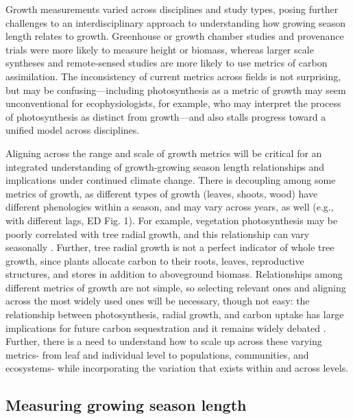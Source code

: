 \documentclass[11pt]{article}
\begin{document}
Growth measurements varied across disciplines and study types, posing further challenges to an interdisciplinary approach to understanding how growing season length relates to growth. 
Greenhouse or growth chamber studies and provenance trials were more likely to measure height or biomass, whereas larger scale syntheses and remote-sensed studies are more likely to use metrics of carbon assimilation. 
The inconsistency of current metrics across fields is not surprising, but may be confusing---including photosynthesis as a metric of growth may seem unconventional for ecophysiologists, for example, who may interpret the process of photosynthesis as distinct from growth---and also stalls progress toward a unified model across disciplines.

Aligning across the range and scale of growth metrics will be critical for an integrated understanding of growth-growing season length relationships and implications under continued climate change.  
There is decoupling among some metrics of growth, as different types of growth (leaves, shoots, wood) have different phenologies within a season, and may vary across years, as well (e.g., with different lags, ED Fig. 1).
For example, vegetation photosynthesis may be poorly correlated with tree radial growth, and this relationship can vary seasonally \citep{cabon2022cross}. 
Further, tree radial growth is not a perfect indicator of whole tree growth, since plants allocate carbon to their roots, leaves, reproductive structures, and stores in addition to aboveground biomass. 
Relationships among different metrics of growth are not simple, so selecting relevant ones and aligning across the most widely used ones will be necessary, though not easy: the relationship  between photosynthesis, radial growth, and carbon uptake has large implications for future carbon sequestration and it remains widely debated \citep{green2022limits}. 
Further, there is a need to understand how to scale up across these varying metrics- from leaf and individual level to populations, communities, and ecosystems- while incorporating the variation that exists within and across levels.

\subsection*{Measuring growing season length}
\end{document}
